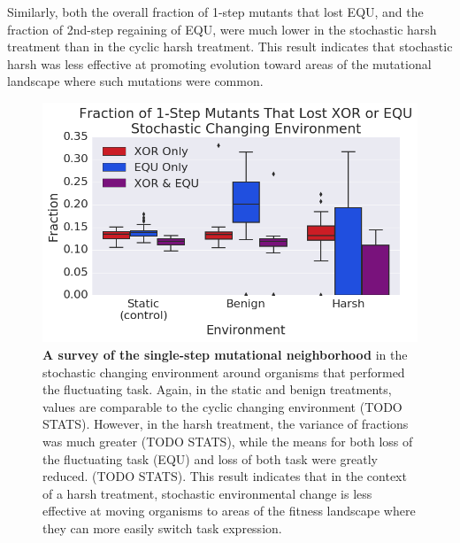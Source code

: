 \documentclass[letterpaper]{article}
\begin{document}
Similarly, both the overall fraction of 1-step mutants that lost EQU, and the fraction of 2nd-step regaining of EQU, were much lower in the stochastic harsh treatment than in the cyclic harsh treatment. This result indicates that stochastic harsh was less effective at promoting evolution toward areas of the mutational landscape where such mutations were common. %

\begin{figure}[h!] %
\begin{center}
\includegraphics[trim={0.2cm 0 0 0.2cm},clip,width=1\columnwidth]{figures/CSE_frac_1step__box.png}
\caption{\textbf{A survey of the single-step mutational neighborhood} in the stochastic changing environment around organisms that performed the fluctuating task. Again, in the static and benign treatments, values are comparable to the cyclic changing environment (TODO STATS). However, in the harsh treatment, the variance of fractions was much greater (TODO STATS), while the means for both loss of the fluctuating task (EQU) and loss of both task were greatly reduced. (TODO STATS). This result indicates that in the context of a harsh treatment, stochastic environmental change is less effective at moving organisms to areas of the fitness landscape where they can more easily switch task expression. %
}\label{fig:CSE_single_step}
\end{center}
\end{figure}
\end{document}

